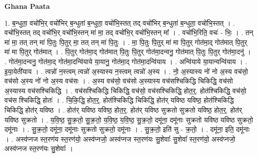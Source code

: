 \documentclass[17pt]{extarticle}
\begin{document}
\textbf{Ghana Paata } \newline

1. ब॒न्धुता॒ वचो॑भि॒र् वचो॑भिर् ब॒न्धुता॑ ब॒न्धुता॒ वचो॑भि॒स्तत् तद् वचो॑भिर् ब॒न्धुता॑ ब॒न्धुता॒ वचो॑भि॒स्तत् । . वचो॑भि॒स्तत् तद् वचो॑भि॒र् वचो॑भि॒स्तन् मा॑ मा॒ तद् वचो॑भि॒र् वचो॑भि॒स्तन् मा᳚ । . वचो॑भि॒रिति॒ वचः॑ - भिः॒ । . तन् मा॑ मा॒ तत् तन् मा॑ पि॒तुः पि॒तुर् मा॒ तत् तन् मा॑ पि॒तुः । . मा॒ पि॒तुः पि॒तुर् मा॑ मा पि॒तुर् गोत॑मा॒द् गोत॑मात् पि॒तुर् मा॑ मा पि॒तुर् गोत॑मात् । . पि॒तुर् गोत॑मा॒द् गोत॑मात् पि॒तुः पि॒तुर् गोत॑मा॒दन्वनु॒ गोत॑मात् पि॒तुः पि॒तुर् गोत॑मा॒दनु॑ । . गोत॑मा॒दन्वनु॒ गोत॑मा॒द् गोत॑मा॒दन्वि॑याये या॒यानु॒ गोत॑मा॒द् गोत॑मा॒दन्वि॑याय । . अन्वि॑याये या॒यान्वन्वि॑याय । . इ॒या॒येती॑याय । . त्वन्नो॑ न॒स्त्वम् त्वन्नो॑ अ॒स्यास्य न॒स्त्वम् त्वन्नो॑ अ॒स्य । . नो॒ अ॒स्यास्य नो॑ नो अ॒स्य वच॑सो॒ वच॑सो अ॒स्य नो॑ नो अ॒स्य वच॑सः । . अ॒स्य वच॑सो॒ वच॑सो अ॒स्यास्य वच॑सश्चिकिद्धि चिकिद्धि॒ वच॑सो अ॒स्यास्य वच॑सश्चिकिद्धि । . वच॑सश्चिकिद्धि चिकिद्धि॒ वच॑सो॒ वच॑सश्चिकिद्धि॒ होत॒र्॒. होत॑श्चिकिद्धि॒ वच॑सो॒ वच॑स श्चिकिद्धि॒ होतः॑ । . चि॒कि॒द्धि॒ होत॒र्॒. होत॑श्चिकिद्धि चिकिद्धि॒ होत॑र् यविष्ठ यविष्ठ॒ होत॑श्चिकिद्धि चिकिद्धि॒ होत॑र् यविष्ठ । . होत॑र् यविष्ठ यविष्ठ॒ होत॒र्॒. होत॑र् यविष्ठ सुक्रतो सुक्रतो यविष्ठ॒ होत॒र्॒. होत॑र् यविष्ठ सुक्रतो । . य॒वि॒ष्ठ॒ सु॒क्र॒तो॒ सु॒क्र॒तो॒ य॒वि॒ष्ठ॒ य॒वि॒ष्ठ॒ सु॒क्र॒तो॒ दमू॑ना॒ दमू॑नाः सुक्रतो यविष्ठ यविष्ठ सुक्रतो॒ दमू॑नाः । . सु॒क्र॒तो॒ दमू॑ना॒ दमू॑नाः सुक्रतो सुक्रतो॒ दमू॑नाः । . सु॒क्र॒तो॒ इति॑ सु - क्र॒तो॒ । . दमू॑ना॒ इति॒ दमू॑नाः । . अस्व॑प्नज स्त॒रण॑य स्त॒रण॑यो॒ अस्व॑प्नजो॒ अस्व॑प्नज स्त॒रण॑यः सु॒शेवाः᳚ सु॒शेवा᳚ स्त॒रण॑यो॒ अस्व॑प्नजो॒ अस्व॑प्नज स्त॒रण॑यः सु॒शेवाः᳚ । \newline
\end{document}
